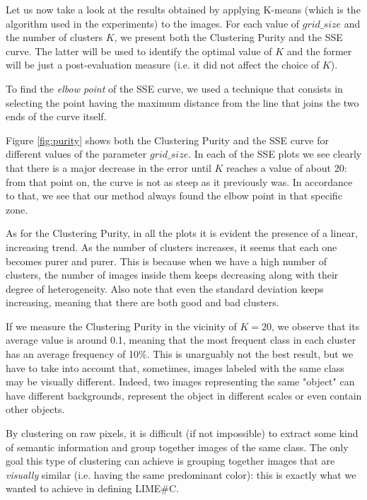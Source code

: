 \documentclass[12pt, twoside, a4paper]{report}
\begin{document}
Let us now take a look at the results obtained by applying K-means (which is the algorithm used in the experiments) to the images. For each value of $grid\_size$ and the number of clusters $K$, we present both the Clustering Purity and the SSE curve. The latter will be used to identify the optimal value of $K$ and the former will be just a post-evaluation measure (i.e. it did not affect the choice of $K$). 

To find the \textit{elbow point} of the SSE curve, we used a technique that consists in selecting the point having the maximum distance from the line that joins the two ends of the curve itself.

Figure \ref{fig:purity} shows both the Clustering Purity and the SSE curve for different values of the parameter $grid\_size$. In each of the SSE plots we see clearly that there is a major decrease in the error until $K$ reaches a value of about 20: from that point on, the curve is not as steep as it previously was. In accordance to that, we see that our method always found the elbow point in that specific zone.

As for the Clustering Purity, in all the plots it is evident the presence of a linear, increasing trend. As the number of clusters increases, it seems that each one becomes purer and purer. This is because when we have a high number of clusters, the number of images inside them keeps decreasing along with their degree of heterogeneity. Also note that even the standard deviation keeps increasing, meaning that there are both good and bad clusters.

If we measure the Clustering Purity in the vicinity of $K=20$, we observe that its average value is around 0.1, meaning that the most frequent class in each cluster has an average frequency of 10\%. 
This is unarguably not the best result, but we have to take into account that, sometimes, images labeled with the same class may be visually different. Indeed, two images representing the same "object" can have different backgrounds, represent the object in different scales or even contain other objects. 

By clustering on raw pixels, it is difficult (if not impossible) to extract some kind of semantic information and group together images of the same class. The only goal  this type of clustering can achieve is grouping together images that are \textit{visually} similar (i.e. having the same predominant color): this is exactly what we wanted to achieve in defining LIME\#C. 
\end{document}
